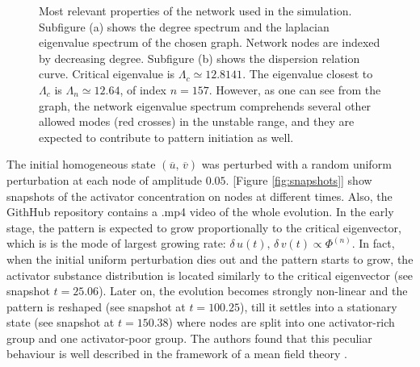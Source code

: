 \begin{figure}[H]
\caption{Most relevant properties of the network used in the simulation. Subfigure (a) shows the degree spectrum and the laplacian eigenvalue spectrum of the chosen graph. Network nodes are indexed by decreasing degree. Subfigure (b) shows the dispersion relation curve. Critical eigenvalue is $\Lambda_c \simeq 12.8141$. The eigenvalue closest to $\Lambda_c$ is $\Lambda_n \simeq 12.64$, of index $n=157$. However, as one can see from the graph, the network eigenvalue spectrum comprehends several other allowed modes (red crosses) in the unstable range, and they are expected to contribute to pattern initiation as well.}
\end{figure}
\noindent
The initial homogeneous state $(\overline{u},\,\overline{v})$ was perturbed with a random uniform perturbation at each node of amplitude $0.05$. [Figure \ref{fig:snapshots}] show snapshots of the activator concentration on nodes at different times. Also, the GithHub repository \cite{git} contains a .mp4 video of the whole evolution. \medskip \newline \noindent
In the early stage, the pattern is expected to grow proportionally to the critical eigenvector, which is is the mode of largest growing rate: $\delta\,u(t),\, \delta\,v(t) \propto \Phi^{(n)}$.
In fact, when the initial uniform perturbation dies out and the pattern starts to grow, the activator substance distribution is located similarly to the critical eigenvector (see snapshot $t = 25.06$). Later on, the evolution becomes strongly non-linear and the pattern is reshaped (see snapshot at $t = 100.25$), till it settles into a stationary state (see snapshot at $t = 150.38$) where nodes are split into one activator-rich group and one activator-poor group. The authors found that this peculiar behaviour is well described in the framework of a mean field theory \cite{main_network}. \medskip \newline \noindent

